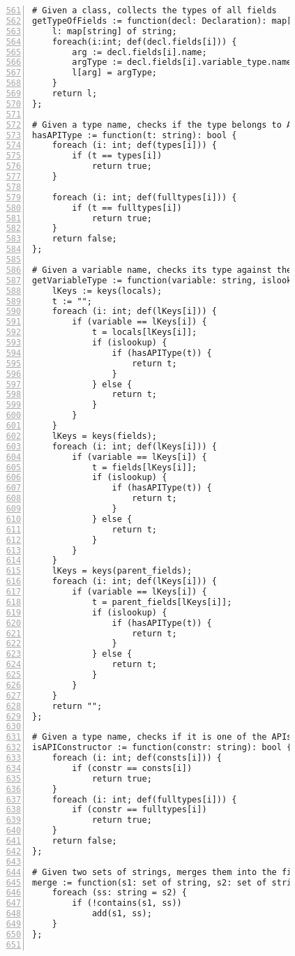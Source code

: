 \begin{figure}[ht!]
\begin{lstlisting}[numbers=left, tabsize=4, escapechar=@, caption={API Usage Mining Analysis},label={lst:aun-code},  firstline = 561, firstnumber = 561, lastline = 621]
# Given a class, collects the types of all fields
getTypeOfFields := function(decl: Declaration): map[string] of string {
    l: map[string] of string;
    foreach(i:int; def(decl.fields[i])) {
        arg := decl.fields[i].name;
        argType := decl.fields[i].variable_type.name;
        l[arg] = argType;
    }
    return l;
};

# Given a type name, checks if the type belongs to APIs of interest
hasAPIType := function(t: string): bool {
    foreach (i: int; def(types[i])) {
        if (t == types[i])
            return true;
    }
    
    foreach (i: int; def(fulltypes[i])) {
        if (t == fulltypes[i])
            return true;
    }
    return false;    
};

# Given a variable name, checks its type against the APIs of interest
getVariableType := function(variable: string, islookup: bool): string {
    lKeys := keys(locals);
    t := "";
    foreach (i: int; def(lKeys[i])) {
        if (variable == lKeys[i]) {
            t = locals[lKeys[i]];
            if (islookup) {
                if (hasAPIType(t)) {
                    return t;
                }
            } else {
                return t;
            }
        }
    }
    lKeys = keys(fields);
    foreach (i: int; def(lKeys[i])) {
        if (variable == lKeys[i]) {
            t = fields[lKeys[i]];
            if (islookup) {
                if (hasAPIType(t)) {
                    return t;
                }
            } else {
                return t;
            }
        }
    }
    lKeys = keys(parent_fields);
    foreach (i: int; def(lKeys[i])) {
        if (variable == lKeys[i]) {
            t = parent_fields[lKeys[i]];
            if (islookup) {
                if (hasAPIType(t)) {
                    return t;
                }
            } else {
                return t;
            }
        }
    }
    return "";
}; 

# Given a type name, checks if it is one of the APIs of interest
isAPIConstructor := function(constr: string): bool {
    foreach (i: int; def(consts[i])) {
        if (constr == consts[i])
            return true;
    }
    foreach (i: int; def(fulltypes[i])) {
        if (constr == fulltypes[i])
            return true;
    }
    return false;
};

# Given two sets of strings, merges them into the first set retaining only unique elements
merge := function(s1: set of string, s2: set of string) {
    foreach (ss: string = s2) {
        if (!contains(s1, ss))
            add(s1, ss);
    }
};


\end{lstlisting}
\end{figure}
